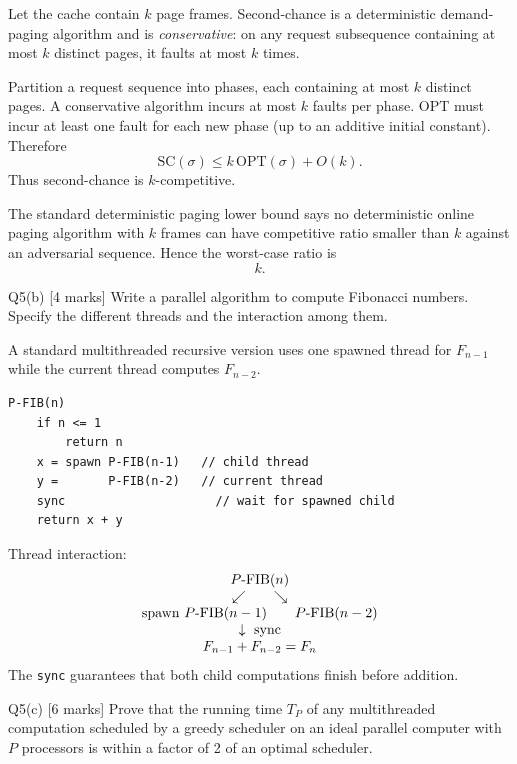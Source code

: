\documentclass[10.5pt,a4paper]{article}
\begin{document}
\begin{answerbox}
Let the cache contain \(k\) page frames. Second-chance is a deterministic demand-paging algorithm and is \emph{conservative}: on any request subsequence containing at most \(k\) distinct pages, it faults at most \(k\) times.

Partition a request sequence into phases, each containing at most \(k\) distinct pages. A conservative algorithm incurs at most \(k\) faults per phase. OPT must incur at least one fault for each new phase (up to an additive initial constant). Therefore
\[
\text{SC}(\sigma)\le k\,\text{OPT}(\sigma)+O(k).
\]
Thus second-chance is \(k\)-competitive.

The standard deterministic paging lower bound says no deterministic online paging algorithm with \(k\) frames can have competitive ratio smaller than \(k\) against an adversarial sequence. Hence the worst-case ratio is
\[
\boxed{k}.
\]
\end{answerbox}

\begin{questionbox}{Q5(b) [4 marks]}
Write a parallel algorithm to compute Fibonacci numbers. Specify the different threads and the interaction among them.
\end{questionbox}

\begin{answerbox}
A standard multithreaded recursive version uses one spawned thread for \(F_{n-1}\) while the current thread computes \(F_{n-2}\).

\begin{verbatim}
P-FIB(n)
    if n <= 1
        return n
    x = spawn P-FIB(n-1)   // child thread
    y =       P-FIB(n-2)   // current thread
    sync                     // wait for spawned child
    return x + y
\end{verbatim}

Thread interaction:
\[
\begin{array}{c}
P\text{-FIB}(n)\\
\swarrow\qquad\searrow\\
\text{spawn }P\text{-FIB}(n-1)\qquad P\text{-FIB}(n-2)\\
\multicolumn{1}{c}{\downarrow\ \text{sync}}\\
F_{n-1}+F_{n-2}=F_n
\end{array}
\]
The \texttt{sync} guarantees that both child computations finish before addition.
\end{answerbox}

\begin{questionbox}{Q5(c) [6 marks]}
Prove that the running time \(T_P\) of any multithreaded computation scheduled by a greedy scheduler on an ideal parallel computer with \(P\) processors is within a factor of 2 of an optimal scheduler.
\end{questionbox}
\end{document}
